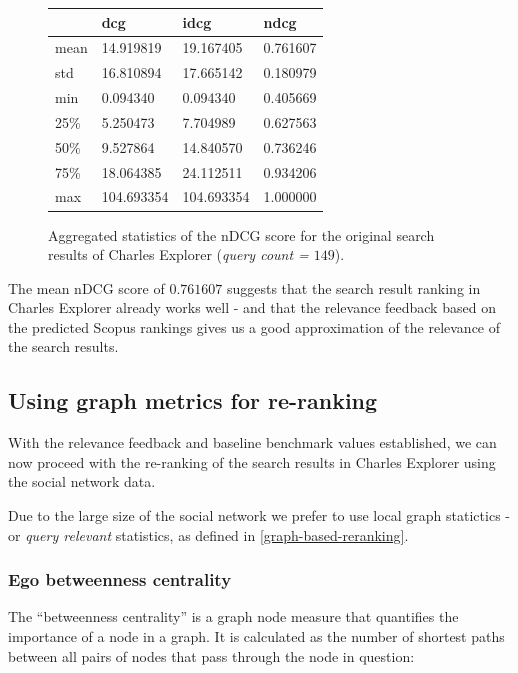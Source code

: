\begin{figure}[!ht]
    \captionsetup{width=.9\linewidth}
    \centering
    \begin{tabular}{|l|l|l|l|}
    \hline
        ~ & dcg & idcg & ndcg \\ \hline
        mean & 14.919819 & 19.167405 & 0.761607 \\ \hline
        std & 16.810894 & 17.665142 & 0.180979 \\ \hline
        min & 0.094340 & 0.094340 & 0.405669 \\ \hline
        25\% & 5.250473 & 7.704989 & 0.627563 \\ \hline
        50\% & 9.527864 & 14.840570 & 0.736246 \\ \hline
        75\% & 18.064385 & 24.112511 & 0.934206 \\ \hline
        max & 104.693354 & 104.693354 & 1.000000 \\ \hline
    \end{tabular}
    \caption{Aggregated statistics of the nDCG score for the original search results of Charles Explorer (\textit{query count = $149$}).}
\end{figure}

The mean nDCG score of $0.761607$ suggests that the search result ranking in Charles Explorer already works well - and that the relevance feedback based on the predicted Scopus rankings gives us a good approximation of the relevance of the search results.

\subsection{Using graph metrics for re-ranking}

With the relevance feedback and baseline benchmark values established, we can now proceed with the re-ranking of the search results in Charles Explorer using the social network data.

Due to the large size of the social network %
we prefer to use local graph statictics - or \textit{query relevant} statistics, as defined in \ref{graph-based-reranking}.

\subsubsection{Ego betweenness centrality}\label{ego-betweenness}

The “betweenness centrality” is a graph node measure that quantifies the importance of a node in a graph. 
It is calculated as the number of shortest paths between all pairs of nodes that pass through the node in question:

